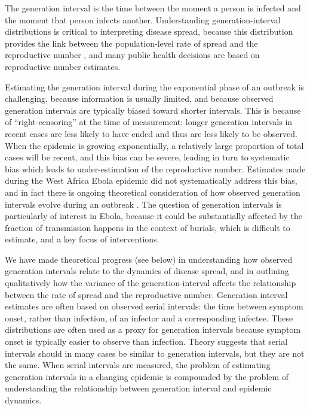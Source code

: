 \documentclass[12pt]{article}
\begin{document}
The generation interval is the time between the moment a person is infected and the moment that person infects another. Understanding generation-interval distributions is critical to interpreting disease spread, because this distribution provides the link between the population-level rate of spread and the reproductive number \cite{Wallinga2007bk}, and many public health decisions are based on reproductive number estimates.

Estimating the generation interval during the exponential phase of an outbreak is challenging, because information is usually limited, and because observed generation intervals are typically biased toward shorter intervals. This is because of ``right-censoring'' at the time of measurement: longer generation intervals in recent cases are less likely to have ended and thus are less likely to be observed.  When the epidemic is growing exponentially, a relatively large proportion of total cases will be recent, and this bias can be severe, leading in turn to systematic bias which leads to under-estimation of the reproductive number.  Estimates made during the West Africa Ebola epidemic did not systematically address this bias, and in fact there is ongoing theoretical consideration of how observed generation intervals evolve during an outbreak \cite{Tomba2010ig, Nishiura2009ct}. The question of generation intervals is particularly of interest in Ebola, because it could be substantially affected by the fraction of transmission happens in the context of burials, which is difficult to estimate, and a key focus of interventions.

We have made theoretical progress (see below) in understanding how observed generation intervals relate to the dynamics of disease spread, and in outlining qualitatively how the variance of the generation-interval affects the relationship between the rate of spread and the reproductive number. Generation interval estimates are often based on observed serial intervals: the time between symptom onset, rather than infection, of an infector and a corresponding infectee. These distributions are often used as a proxy for generation intervals because symptom onset is typically easier to observe than infection. Theory suggests that serial intervals should in many cases be similar to generation intervals, but they are not the same. When serial intervals are measured, the problem of estimating generation intervals in a changing epidemic is compounded by the problem of understanding the relationship between generation interval and epidemic dynamics.
\end{document}
